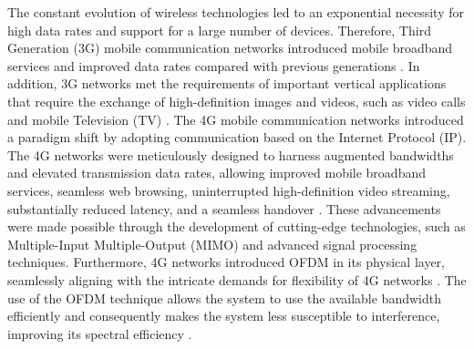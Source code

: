 \documentclass[conference]{IEEEtran}
\begin{document}
The constant evolution of wireless technologies led to an exponential necessity for high data rates and support for a large number of devices. Therefore, Third Generation (3G) mobile communication networks introduced mobile broadband services and improved data rates compared with previous generations \cite{b19, b20}. In addition, 3G networks met the requirements of important vertical applications that require the exchange of high-definition images and videos, such as video calls and mobile Television (TV) \cite{b21, b22}. The 4G mobile communication networks introduced a paradigm shift by adopting communication based on the Internet Protocol (IP). The 4G networks were meticulously designed to harness augmented bandwidths and elevated transmission data rates, allowing improved mobile broadband services, seamless web browsing, uninterrupted high-definition video streaming, substantially reduced latency, and a seamless handover \cite{b23, b24, b25, b26}. These advancements were made possible through the development of cutting-edge technologies, such as Multiple-Input Multiple-Output (MIMO) and advanced signal processing techniques. Furthermore, 4G networks introduced OFDM in its physical layer, seamlessly aligning with the intricate demands for flexibility of 4G networks \cite{b1}. The use of the OFDM technique allows the system to use the available bandwidth efficiently and consequently makes the system less susceptible to interference, improving its spectral efficiency \cite{b27, b28}.
\end{document}
